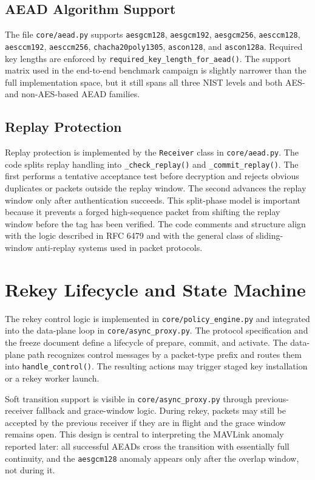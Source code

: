 \documentclass[11pt]{article}
\begin{document}
\subsection{AEAD Algorithm Support}
The file \texttt{core/aead.py} supports \texttt{aesgcm128}, \texttt{aesgcm192}, \texttt{aesgcm256}, \texttt{aesccm128}, \texttt{aesccm192}, \texttt{aesccm256}, \texttt{chacha20poly1305}, \texttt{ascon128}, and \texttt{ascon128a}. Required key lengths are enforced by \texttt{required\_key\_length\_for\_aead()}. The support matrix used in the end-to-end benchmark campaign is slightly narrower than the full implementation space, but it still spans all three NIST levels and both AES- and non-AES-based AEAD families.

\subsection{Replay Protection}
Replay protection is implemented by the \texttt{Receiver} class in \texttt{core/aead.py}. The code splits replay handling into \texttt{\_check\_replay()} and \texttt{\_commit\_replay()}. The first performs a tentative acceptance test before decryption and rejects obvious duplicates or packets outside the replay window. The second advances the replay window only after authentication succeeds. This split-phase model is important because it prevents a forged high-sequence packet from shifting the replay window before the tag has been verified. The code comments and structure align with the logic described in RFC 6479 and with the general class of sliding-window anti-replay systems used in packet protocols.

\section{Rekey Lifecycle and State Machine}
The rekey control logic is implemented in \texttt{core/policy\_engine.py} and integrated into the data-plane loop in \texttt{core/async\_proxy.py}. The protocol specification and the freeze document define a lifecycle of prepare, commit, and activate. The data-plane path recognizes control messages by a packet-type prefix and routes them into \texttt{handle\_control()}. The resulting actions may trigger staged key installation or a rekey worker launch.

Soft transition support is visible in \texttt{core/async\_proxy.py} through previous-receiver fallback and grace-window logic. During rekey, packets may still be accepted by the previous receiver if they are in flight and the grace window remains open. This design is central to interpreting the MAVLink anomaly reported later: all successful AEADs cross the transition with essentially full continuity, and the \texttt{aesgcm128} anomaly appears only after the overlap window, not during it.
\end{document}
